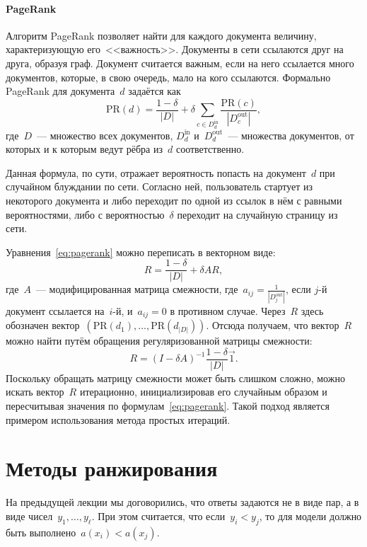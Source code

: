 \documentclass[12pt,fleqn]{article}
\begin{document}
\paragraph{PageRank}
Алгоритм PageRank позволяет найти для каждого документа величину,
характеризующую его~<<важность>>.
Документы в сети ссылаются друг на друга, образуя граф.
Документ считается важным, если на него ссылается много документов,
которые, в свою очередь, мало на кого ссылаются.
Формально PageRank для документа~$d$ задаётся как
\begin{equation}
\label{eq:pagerank}
    \text{PR}(d)
    =
    \frac{1 - \delta}{|D|}
    +
    \delta
    \sum_{c \in D_d^\text{in}}
        \frac{
            \text{PR}(c)
        }{
            |D_c^\text{out}|
        },
\end{equation}
где~$D$~--- множество всех документов,
$D_d^\text{in}$ и~$D_d^\text{out}$~--- множества документов, от которых и к которым ведут рёбра из~$d$ соответственно.

Данная формула, по сути, отражает вероятность попасть на документ~$d$ при случайном блуждании по сети.
Согласно ней, пользователь стартует из некоторого документа и либо переходит по одной из ссылок в нём с равными вероятностями,
либо с вероятностью~$\delta$ переходит на случайную страницу из сети.

Уравнения~\eqref{eq:pagerank} можно переписать в векторном виде:
\[
    R
    =
    \frac{1 - \delta}{|D|}
    +
    \delta A R,
\]
где~$A$~--- модифицированная матрица смежности, где~$a_{ij} = \frac{1}{|D_j^\text{out}|}$,
если $j$-й документ ссылается на~$i$-й, и~$a_{ij} = 0$ в противном случае.
Через~$R$ здесь обозначен вектор~$(\text{PR}(d_1), \dots, \text{PR}(d_|D|))$.
Отсюда получаем, что вектор~$R$ можно найти путём обращения регуляризованной матрицы смежности:
\[
    R
    =
    (I - \delta A)^{-1}
    \frac{1 - \delta}{|D|}
    \vec 1.
\]
Поскольку обращать матрицу смежности может быть слишком сложно,
можно искать вектор~$R$ итерационно, инициализировав его случайным образом
и пересчитывая значения по формулам~\eqref{eq:pagerank}.
Такой подход является примером использования метода простых итераций.

\section{Методы ранжирования}
На предыдущей лекции мы договорились, что ответы задаются не в виде пар,
а в виде чисел~$y_1, \dots, y_\ell$.
При этом считается, что если~$y_i < y_j$, то для модели должно быть выполнено~$a(x_i) < a(x_j)$.
\end{document}
